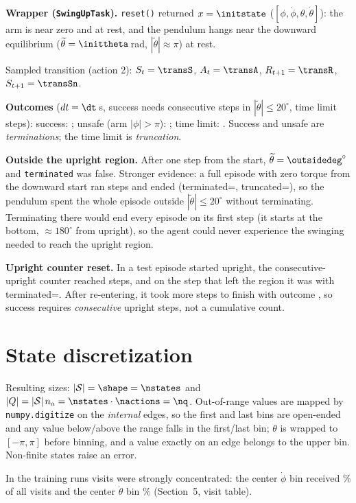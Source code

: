 \documentclass[11pt]{article}
\begin{document}
\textbf{Wrapper (\texttt{SwingUpTask}).} \texttt{reset()} returned $x=\initstate$ ($[\phi,\dot\phi,\theta,\dot\theta]$): the arm is near zero and at rest, and the pendulum hangs near the downward equilibrium ($\widetilde\theta=\inittheta$\,rad, $|\widetilde\theta|\approx\pi$) at rest.
\begin{center}\end{center}
Sampled transition (action 2): $S_t=\transS$, $A_t=\transA$, $R_{t+1}=\transR$, $S_{t+1}=\transSn$.

\textbf{Outcomes} ($dt=\dt$\,s, success needs \successsteps{} consecutive steps in $|\widetilde\theta|\le20^\circ$, time limit \maxsteps{} steps): success: \outsuccess; unsafe (arm $|\phi|>\pi$): \outunsafe; time limit: \outtimeout. Success and unsafe are \emph{terminations}; the time limit is \emph{truncation}.

\textbf{Outside the upright region.} After one step from the start, $\widetilde\theta=\outsidedeg^\circ$ and \texttt{terminated} was false. Stronger evidence: a full episode with zero torque from the downward start ran \zeroSteps{} steps and ended \zeroOutcome{} (terminated=\zeroTerm, truncated=\zeroTrunc), so the pendulum spent the whole episode outside $|\widetilde\theta|\le20^\circ$ without terminating. Terminating there would end every episode on its first step (it starts at the bottom, $\approx180^\circ$ from upright), so the agent could never experience the swinging needed to reach the upright region.

\textbf{Upright counter reset.} In a test episode started upright, the consecutive-upright counter reached \ctrBefore{} steps, and on the step that left the region it was \ctrAfter{} with terminated=\ctrTermExit. After re-entering, it took \ctrReentry{} more steps to finish with outcome \ctrOutcome, so success requires \successsteps{} \emph{consecutive} upright steps, not a cumulative count.

\section{State discretization}
\begin{center}\end{center}
Resulting sizes: $|\mathcal S|=\shape=\nstates$ and $|Q|=|\mathcal S|\,n_a=\nstates\cdot\nactions=\nq$.
Out-of-range values are mapped by \texttt{numpy.digitize} on the \emph{internal} edges, so the first and last bins are open-ended and any value below/above the range falls in the first/last bin; $\theta$ is wrapped to $[-\pi,\pi]$ before binning, and a value exactly on an edge belongs to the upper bin. Non-finite states raise an error.
\begin{center}\small\end{center}
In the training runs visits were strongly concentrated: the center $\dot\phi$ bin received \phidotCenter\% of all visits and the center $\dot\theta$ bin \thdotCenter\% (Section~5, visit table).
\end{document}
